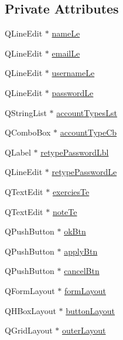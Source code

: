 \subsection*{Private Attributes}
\begin{DoxyCompactItemize}
\item 
Q\-Line\-Edit $\ast$ \hyperlink{class_user_abstract_gui_aef34354ca561f53cab79f1ea7f7daccc}{name\-Le}
\item 
Q\-Line\-Edit $\ast$ \hyperlink{class_user_abstract_gui_aff0b81d70ad0e9c5b140b78d9932d334}{email\-Le}
\item 
Q\-Line\-Edit $\ast$ \hyperlink{class_user_abstract_gui_acfbb80fed175f16538b040da8b831a49}{username\-Le}
\item 
Q\-Line\-Edit $\ast$ \hyperlink{class_user_abstract_gui_a142e171d275b18d682c7ba38097e7234}{password\-Le}
\item 
Q\-String\-List $\ast$ \hyperlink{class_user_abstract_gui_ab9b3708ae3bf7bad2bc5028f771d8649}{account\-Types\-Lst}
\item 
Q\-Combo\-Box $\ast$ \hyperlink{class_user_abstract_gui_ae4e3c37c68ef01e91687d7732e45d78d}{account\-Type\-Cb}
\item 
Q\-Label $\ast$ \hyperlink{class_user_abstract_gui_a06db7b52e0c603b4aa91c644c8489944}{retype\-Password\-Lbl}
\item 
Q\-Line\-Edit $\ast$ \hyperlink{class_user_abstract_gui_a237ffc88f49abdaf80d0a2ca13614082}{retype\-Password\-Le}
\item 
Q\-Text\-Edit $\ast$ \hyperlink{class_user_abstract_gui_accbf7028eeb10900a87717ff261ac7c9}{exercies\-Te}
\item 
Q\-Text\-Edit $\ast$ \hyperlink{class_user_abstract_gui_aa648183d58b7705df3d47017d1d7e650}{note\-Te}
\item 
Q\-Push\-Button $\ast$ \hyperlink{class_user_abstract_gui_ac0b0565555718eff6a0c3cd80ca54c47}{ok\-Btn}
\item 
Q\-Push\-Button $\ast$ \hyperlink{class_user_abstract_gui_a84e6aafe45debec2b57447a5ea60a241}{apply\-Btn}
\item 
Q\-Push\-Button $\ast$ \hyperlink{class_user_abstract_gui_ae1b73e2d98c40db351bb87e96d9070b4}{cancel\-Btn}
\item 
Q\-Form\-Layout $\ast$ \hyperlink{class_user_abstract_gui_a06ebded83079e3b09a836e6e4728069f}{form\-Layout}
\item 
Q\-H\-Box\-Layout $\ast$ \hyperlink{class_user_abstract_gui_abbe97aecb48e75d88cfc6fe87149930b}{button\-Layout}
\item 
Q\-Grid\-Layout $\ast$ \hyperlink{class_user_abstract_gui_a57a629bb0604b8eed762ec523f904f01}{outer\-Layout}
\end{DoxyCompactItemize}


